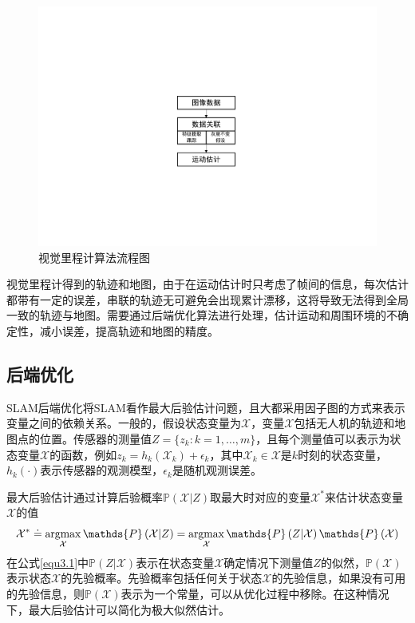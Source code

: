 \begin{figure}[h]
\centering
\includegraphics[scale=0.7,angle=-90]{figures/Fig3-2.pdf}
\caption{视觉里程计算法流程图}
\label{fig3.2}
\end{figure}
\vspace{-20pt}

视觉里程计得到的轨迹和地图，由于在运动估计时只考虑了帧间的信息，每次估计都带有一定的误差，串联的轨迹无可避免会出现累计漂移，这将导致无法得到全局一致的轨迹与地图。需要通过后端优化算法进行处理，估计运动和周围环境的不确定性，减小误差，提高轨迹和地图的精度。


\subsection{后端优化}
SLAM后端优化将SLAM看作最大后验估计问题，且大都采用因子图的方式来表示变量之间的依赖关系\upcite{[3.2]}。一般的，假设状态变量为$\mathcal{X}$，变量$\mathcal{X}$包括无人机的轨迹和地图点的位置。传感器的测量值$Z=\lbrace z_k:k=1,\ldots ,m\rbrace$，且每个测量值可以表示为状态变量$\mathcal{X}$的函数，例如$z_k=h_k\left( \mathcal{X}_k \right)+\epsilon_k$，其中$\mathcal{X}_k \in \mathcal{X}$是$k$时刻的状态变量，$h_k(\cdot)$表示传感器的观测模型，$\epsilon_k$是随机观测误差。

最大后验估计通过计算后验概率$\mathds{P}\left(\mathcal{X} \vert Z\right)$取最大时对应的变量$\mathcal{X}^*$来估计状态变量$\mathcal{X}$的值
\begin{equation}
\label{equ3.1}
\mathcal{X}^* 
\doteq 
\argmax \limits_{\mathcal{X}} \mathds{P}\left(\mathcal{X} \vert Z\right) 
=
\argmax \limits_{\mathcal{X}}\mathds{P}\left(Z \vert \mathcal{X}  \right)\mathds{P}\left(\mathcal{X}\right)
\end{equation}
在公式\eqref{equ3.1}中$\mathds{P}\left(Z \vert \mathcal{X}  \right)$表示在状态变量$\mathcal{X}$确定情况下测量值$Z$的似然，$\mathds{P}\left(\mathcal{X}\right)$表示状态$\mathcal{X}$的先验概率。先验概率包括任何关于状态$\mathcal{X}$的先验信息，如果没有可用的先验信息，则$\mathds{P}\left(\mathcal{X}\right)$表示为一个常量，可以从优化过程中移除。在这种情况下，最大后验估计可以简化为极大似然估计。

